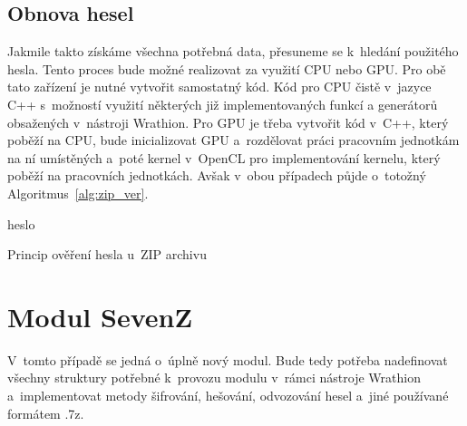 \subsection{Obnova hesel}
Jakmile takto získáme všechna potřebná data, přesuneme se k~hledání použitého hesla. Tento proces
bude možné realizovat za využití CPU nebo GPU. Pro obě tato zařízení je nutné vytvořit samostatný
kód. Kód pro CPU čistě v~jazyce C++ s~možností využití některých již implementovaných funkcí a
generátorů obsažených v~nástroji Wrathion. Pro GPU je třeba vytvořit kód v~C++, který poběží na
CPU, bude inicializovat GPU a~rozdělovat práci pracovním jednotkám na ní umístěných a~poté kernel
v~OpenCL pro implementování kernelu, který poběží na pracovních jednotkách. Avšak v~obou
případech půjde o~totožný Algoritmus~\ref{alg:zip_ver}.

\begin{algorithm}[ht]
    \SetStartEndCondition{ (}{)}{)}\SetAlgoBlockMarkers{}{}%
    \AlgoDisplayBlockMarkers\SetAlgoNoLine%
    \DontPrintSemicolon
    \Return heslo\;
    \caption{Princip ověření hesla u~ZIP archivu}\label{alg:zip_ver}
\end{algorithm}

\section{Modul SevenZ}
V~tomto případě se jedná o~úplně nový modul. Bude tedy potřeba nadefinovat všechny struktury
potřebné k~provozu modulu v~rámci nástroje Wrathion a~implementovat metody šifrování, hešování,
odvozování hesel a~jiné používané formátem .7z.

